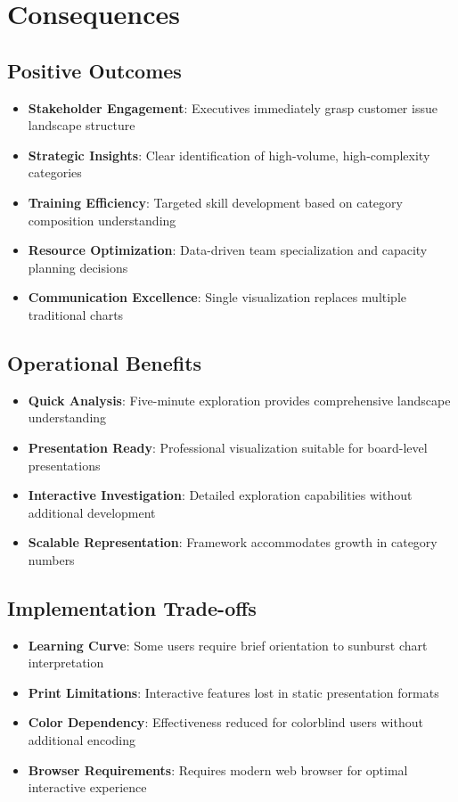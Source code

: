 \documentclass[11pt]{article}
\begin{document}
\section{Consequences}

\subsection{Positive Outcomes}
\begin{itemize}
\item \textbf{Stakeholder Engagement}: Executives immediately grasp customer issue landscape structure
\item \textbf{Strategic Insights}: Clear identification of high-volume, high-complexity categories
\item \textbf{Training Efficiency}: Targeted skill development based on category composition understanding
\item \textbf{Resource Optimization}: Data-driven team specialization and capacity planning decisions
\item \textbf{Communication Excellence}: Single visualization replaces multiple traditional charts
\end{itemize}

\subsection{Operational Benefits}
\begin{itemize}
\item \textbf{Quick Analysis}: Five-minute exploration provides comprehensive landscape understanding
\item \textbf{Presentation Ready}: Professional visualization suitable for board-level presentations
\item \textbf{Interactive Investigation}: Detailed exploration capabilities without additional development
\item \textbf{Scalable Representation}: Framework accommodates growth in category numbers
\end{itemize}

\subsection{Implementation Trade-offs}
\begin{itemize}
\item \textbf{Learning Curve}: Some users require brief orientation to sunburst chart interpretation
\item \textbf{Print Limitations}: Interactive features lost in static presentation formats
\item \textbf{Color Dependency}: Effectiveness reduced for colorblind users without additional encoding
\item \textbf{Browser Requirements}: Requires modern web browser for optimal interactive experience
\end{itemize}
\end{document}
